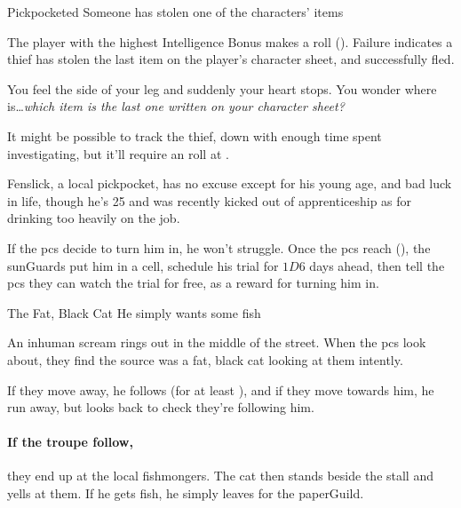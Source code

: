 \label{randommeetings}

{Pickpocketed}%
{Someone has stolen one of the characters' items}%

The player with the highest Intelligence Bonus makes a  roll (\tn[9]).
Failure indicates a thief has stolen the last item on the player's character sheet, and successfully fled.

\begin{boxtext}
  You feel the side of your leg and suddenly your heart stops.
  You wonder where is\ldots \textit{which item is the last one written on your character sheet?}

\end{boxtext}


It might be possible to track the thief, down with enough time spent investigating, but it'll require an  roll at \tn[13].

Fenslick, a local pickpocket, has no excuse except for his young age, and bad luck in life, though he's 25 and was recently kicked out of  apprenticeship as  for drinking too heavily on the job.

If the \glspl{pc} decide to turn him in, he won't struggle.
Once the \glspl{pc} reach  (), the \glspl{sunGuard} put him in a cell, schedule his trial for $1D6$ days ahead, then tell the \glspl{pc} they can watch the trial for free, as a reward for turning him in.

{The Fat, Black Cat}%
{He simply wants some fish}%

An inhuman scream rings out in the middle of the street.
When the \glspl{pc} look about, they find the source was a fat, black cat looking at them intently.

If they move away, he follows (for at least ), and if they move towards him, he run away, but looks back to check they're following him.

\paragraph{If the troupe follow,}
they end up at the local fishmongers.
The cat then stands beside the stall and yells at them.
If he gets fish, he simply leaves for the \gls{paperGuild}.


